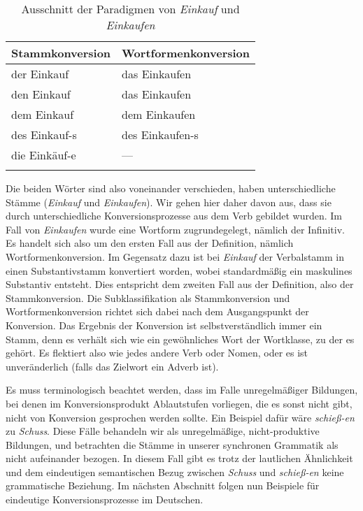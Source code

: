 \begin{table}
  \centering
  \begin{tabular}{ll}
    \lsptoprule
    \textbf{Stammkonversion} & \textbf{Wortformenkonversion} \\
    \midrule
    der Einkauf & das Einkaufen\\
    den Einkauf & das Einkaufen\\
    dem Einkauf & dem Einkaufen\\
    des Einkauf-s & des Einkaufen-s\\
    die Einkäuf-e & --- \\
    \lspbottomrule
  \end{tabular}
  \caption{Ausschnitt der Paradigmen von \textit{Einkauf} und \textit{Einkaufen}}
  \label{tab:einkauf-en}
\end{table}


Die beiden Wörter sind also voneinander verschieden, haben unterschiedliche Stämme (\textit{Einkauf} und \textit{Einkaufen}).
Wir gehen hier daher davon aus, dass sie durch unterschiedliche Konversionsprozesse aus dem Verb gebildet wurden.
Im Fall von \textit{Einkaufen} wurde eine Wortform zugrundegelegt, nämlich der Infinitiv.
Es handelt sich also um den ersten Fall aus der Definition, nämlich Wortformenkonversion.
Im Gegensatz dazu ist bei \textit{Einkauf} der Verbalstamm in einen Substantivstamm konvertiert worden, wobei standardmäßig ein maskulines Substantiv entsteht.
Dies entspricht dem zweiten Fall aus der Definition, also der Stammkonversion.
Die Subklassifikation als Stammkonversion und Wortformenkonversion richtet sich dabei nach dem Ausgangspunkt der Konversion.
Das Ergebnis der Konversion ist selbstverständlich immer ein Stamm, denn es verhält sich wie ein gewöhnliches Wort der Wortklasse, zu der es gehört.
Es flektiert also wie jedes andere Verb oder Nomen, oder es ist unveränderlich (falls das Zielwort \zB ein Adverb ist).

Es muss terminologisch beachtet werden, dass im Falle unregelmäßiger Bildungen, bei denen \zB im Konversionsprodukt Ablautstufen vorliegen, die es sonst nicht gibt, nicht von Konversion gesprochen werden sollte.
Ein Beispiel dafür wäre \textit{schieß-en} zu \textit{Schuss}.
Diese Fälle behandeln wir als unregelmäßige, nicht-pro\-duk\-ti\-ve Bildungen, und betrachten die Stämme in unserer synchronen Grammatik als nicht aufeinander bezogen.
In diesem Fall gibt es trotz der lautlichen Ähnlichkeit und dem eindeutigen semantischen Bezug zwischen \textit{Schuss} und \textit{schieß-en} keine grammatische Beziehung.
Im nächsten Abschnitt folgen nun Beispiele für eindeutige Konversionsprozesse im Deutschen.

